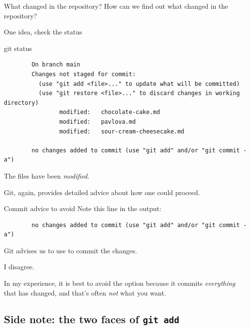 \documentclass{git_course}
\begin{document}
\begin{frame}[fragile]{What changed in the repository?}
    How can we find out what changed in the repository?

    One idea, check the status
    \begin{shellcode}
        git status
    \end{shellcode}
    \begin{verbatim}
        On branch main
        Changes not staged for commit:
          (use "git add <file>..." to update what will be committed)
          (use "git restore <file>..." to discard changes in working directory)
                modified:   chocolate-cake.md
                modified:   pavlova.md
                modified:   sour-cream-cheesecake.md

        no changes added to commit (use "git add" and/or "git commit -a")
    \end{verbatim}

    The files have been \emph{modified}.

    Git, again, provides detailed advice about how one could proceed.
\end{frame}

\begin{frame}[fragile]{Commit advice to avoid}
    Note this line in the  output:
    \begin{verbatim}
        no changes added to commit (use "git add" and/or "git commit -a")
    \end{verbatim}

    Git advises us to use  to commit the changes.

    I disagree.

    In my experience, it is best to avoid the  option because it
    commits \emph{everything} that has changed, and that's often \emph{not}
    what you want.
\end{frame}

\subsection{Side note: the two faces of \texttt{git add}}
\end{document}
